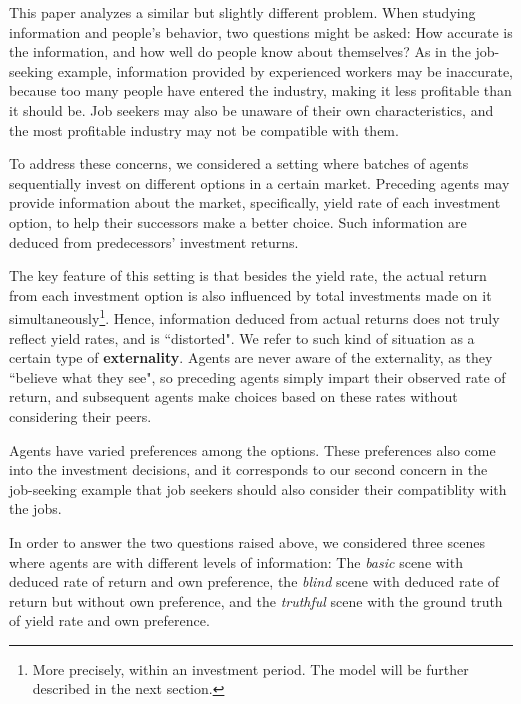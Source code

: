 \documentclass[12pt,english]{article}
\theoremstyle{plain}
\theoremstyle{plain}
\begin{document}
	This paper analyzes a similar but slightly different problem. When studying information and people's behavior, two questions might be asked: How accurate is the information, and how well do people know about themselves? As in the job-seeking example, information provided by experienced workers may be inaccurate, because too many people have entered the industry, making it less profitable than it should be. Job seekers may also be unaware of their own  characteristics, and the most profitable industry may not be compatible with them.\par
	
	To address these concerns, we considered a setting where batches of agents sequentially invest on different options in a certain market. Preceding agents may provide information about the market, specifically, yield rate of each investment option, to help their successors make a better choice. Such information are deduced from predecessors' investment returns.\par
	
	The key feature of this setting is that besides the yield rate, the actual return from each investment option is also influenced by total investments made on it simultaneously\footnote{More precisely, within an investment period. The model will be further described in the next section.}. Hence, information deduced from actual returns does not truly reflect yield rates, and is ``distorted". We refer to such kind of situation as a certain type of \textbf{externality}. Agents are never aware of the externality, as they ``believe what they see", so preceding agents simply impart their observed rate of return, and subsequent agents make choices based on these rates without considering their peers.\par
	
	Agents have varied preferences among the options. These preferences also come into the investment decisions, and it corresponds to our second concern in the job-seeking example that job seekers should also consider their compatiblity with the jobs.\par 
	
	In order to answer the two questions raised above, we considered three scenes where agents are with different levels of information: The \textit{basic} scene with deduced rate of return and own preference, the \textit{blind} scene with deduced rate of return but without own preference, and the \textit{truthful} scene with the ground truth of yield rate and own preference.\par
	
\end{document}
